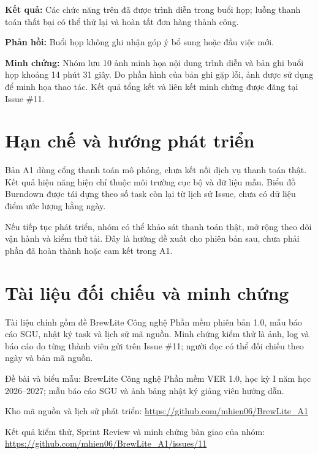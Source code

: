 \documentclass[12pt,a4paper]{report}
\begin{document}
\textbf{Kết quả:} Các chức năng trên đã được trình diễn trong buổi họp; luồng thanh toán thất bại có thể thử lại và hoàn tất đơn hàng thành công.


\textbf{Phản hồi:} Buổi họp không ghi nhận góp ý bổ sung hoặc đầu việc mới.


\textbf{Minh chứng:} Nhóm lưu 10 ảnh minh họa nội dung trình diễn và bản ghi buổi họp khoảng 14 phút 31 giây. Do phần hình của bản ghi gặp lỗi, ảnh được sử dụng để minh họa thao tác. Kết quả tổng kết và liên kết minh chứng được đăng tại Issue \#11.


\section{Hạn chế và hướng phát triển}

Bản A1 dùng cổng thanh toán mô phỏng, chưa kết nối dịch vụ thanh toán thật. Kết quả hiệu năng hiện chỉ thuộc môi trường cục bộ và dữ liệu mẫu. Biểu đồ Burndown được tái dựng theo số task còn lại từ lịch sử Issue, chưa có dữ liệu điểm ước lượng hằng ngày.


Nếu tiếp tục phát triển, nhóm có thể khảo sát thanh toán thật, mở rộng theo dõi vận hành và kiểm thử tải. Đây là hướng đề xuất cho phiên bản sau, chưa phải phần đã hoàn thành hoặc cam kết trong A1.


\section{Tài liệu đối chiếu và minh chứng}

Tài liệu chính gồm đề BrewLite Công nghệ Phần mềm phiên bản 1.0, mẫu báo cáo SGU, nhật ký task và lịch sử mã nguồn. Minh chứng kiểm thử là ảnh, log và báo cáo do từng thành viên gửi trên Issue \#11; người đọc có thể đối chiếu theo ngày và bản mã nguồn.


Đề bài và biểu mẫu: BrewLite Công nghệ Phần mềm VER 1.0, học kỳ I năm học 2026–2027; mẫu báo cáo SGU và ảnh bảng nhật ký giảng viên hướng dẫn.


Kho mã nguồn và lịch sử phát triển: \url{https://github.com/mhien06/BrewLite_A1}


Kết quả kiểm thử, Sprint Review và minh chứng bàn giao của nhóm: \url{https://github.com/mhien06/BrewLite_A1/issues/11}
\end{document}
